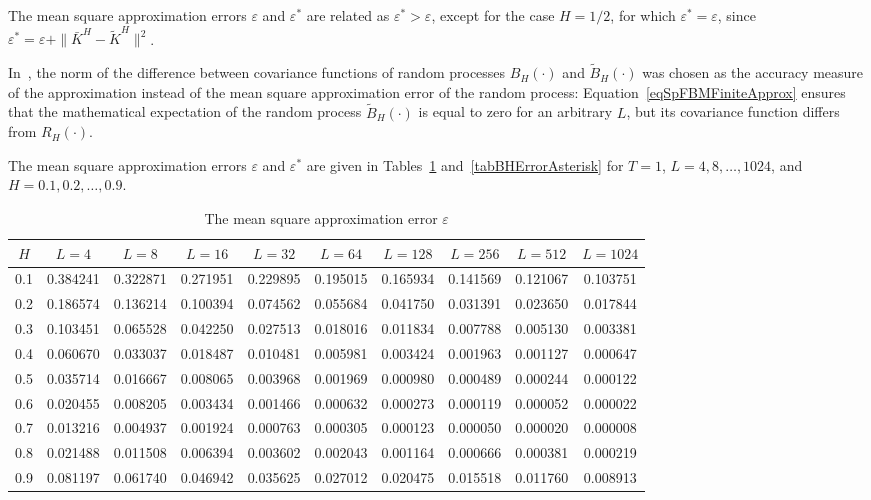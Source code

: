 \documentclass[10pt,reqno]{amsart}
\theoremstyle{plain}
\theoremstyle{remark}
\begin{document}
The mean square approximation errors $\varepsilon$ and $\varepsilon^*$ are related as $\varepsilon^* > \varepsilon$, except for the case $H = 1/2$, for which $\varepsilon^* = \varepsilon$, since $\varepsilon^* = \varepsilon + \|\bar K^H - \tilde K^H\|^2$.

In~\cite{Ryb_Comp25}, the norm of the difference between covariance functions of random processes $B_H(\cdot)$ and $\tilde B_H(\cdot)$ was chosen as the accuracy measure of the approximation instead of the mean square approximation error of the random process: Equation~\eqref{eqSpFBMFiniteApprox} ensures that the mathematical expectation of the random process $\tilde B_H(\cdot)$ is equal to zero for an arbitrary $L$, but its covariance function differs from $R_H(\cdot)$.

The mean square approximation errors $\varepsilon$ and $\varepsilon^*$ are given in Tables~\ref{tabBHError} and~\ref{tabBHErrorAsterisk} for $T = 1$, $L = 4,8,\dots,1024$, and $H = 0.1,0.2,\dots,0.9$.

\begin{table}[ht]
\begin{center}
\renewcommand{\arraystretch}{1.1}
\caption{The mean square approximation error $\varepsilon$}\label{tabBHError}
\begin{tabular}{cccccccccc}
  \hline
  $H$ & $L = 4$ & $L = 8$ & $L = 16$ & $L = 32$ & $L = 64$ & $L = 128$ & $L = 256$ & $L = 512$ & $L = 1024$ \\
  \hline
  0.1 & 0.384241 & 0.322871 & 0.271951 & 0.229895 & 0.195015 & 0.165934 & 0.141569 & 0.121067 & 0.103751 \\
  0.2 & 0.186574 & 0.136214 & 0.100394 & 0.074562 & 0.055684 & 0.041750 & 0.031391 & 0.023650 & 0.017844 \\
  0.3 & 0.103451 & 0.065528 & 0.042250 & 0.027513 & 0.018016 & 0.011834 & 0.007788 & 0.005130 & 0.003381 \\
  0.4 & 0.060670 & 0.033037 & 0.018487 & 0.010481 & 0.005981 & 0.003424 & 0.001963 & 0.001127 & 0.000647 \\
  0.5 & 0.035714 & 0.016667 & 0.008065 & 0.003968 & 0.001969 & 0.000980 & 0.000489 & 0.000244 & 0.000122 \\
  0.6 & 0.020455 & 0.008205 & 0.003434 & 0.001466 & 0.000632 & 0.000273 & 0.000119 & 0.000052 & 0.000022 \\
  0.7 & 0.013216 & 0.004937 & 0.001924 & 0.000763 & 0.000305 & 0.000123 & 0.000050 & 0.000020 & 0.000008 \\
  0.8 & 0.021488 & 0.011508 & 0.006394 & 0.003602 & 0.002043 & 0.001164 & 0.000666 & 0.000381 & 0.000219 \\
  0.9 & 0.081197 & 0.061740 & 0.046942 & 0.035625 & 0.027012 & 0.020475 & 0.015518 & 0.011760 & 0.008913 \\
  \hline
\end{tabular}
\end{center}
\end{table}
\end{document}
